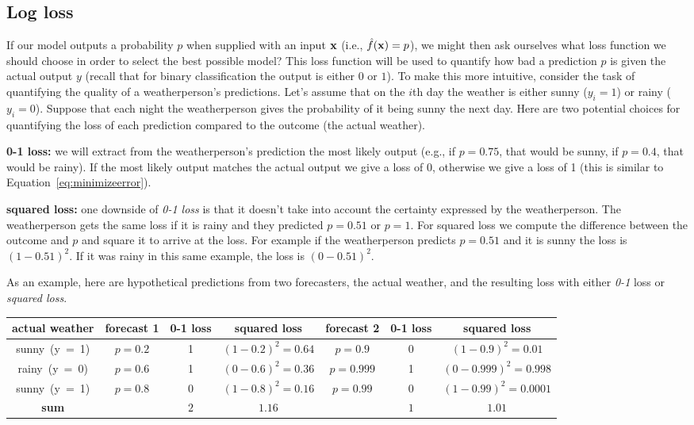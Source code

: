 \documentclass[assignment04_Solutions]{subfiles}
\begin{document}
\subsection{Log loss}
If our model outputs a probability $p$ when supplied with an input $\mathbf{x}$ (i.e., $\hat{f}(\mathbf{x}) = p$), we might then ask ourselves what loss function we should choose in order to select the best possible model?  This loss function will be used to quantify how bad a prediction $p$ is given the actual output $y$ (recall that for binary classification the output is either $0$ or $1$).  To make this more intuitive, consider the task of quantifying the quality of a weatherperson's predictions.  Let's assume that on the $i$th day the weather is either sunny ($y_i = 1$) or rainy ($y_i = 0$).  Suppose that each night the weatherperson gives the probability of it being sunny the next day.  Here are two potential choices for quantifying the loss of each prediction compared to the outcome (the actual weather).
\be
\item \textbf{0-1 loss:} we will extract from the weatherperson's prediction the most likely output (e.g., if $p = 0.75$, that would be sunny, if $p = 0.4$, that would be rainy).  If the most likely output matches the actual output we give a loss of 0, otherwise we give a loss of 1 (this is similar to Equation~\ref{eq:minimizeerror}).
\item \textbf{squared loss:} one downside of \emph{0-1 loss} is that it doesn't take into account the certainty expressed by the weatherperson.  The weatherperson gets the same loss if it is rainy and they predicted $p = 0.51$ or $p = 1$.  For squared loss we compute the difference between the outcome and $p$ and square it to arrive at the loss.  For example if the weatherperson predicts $p = 0.51$ and it is sunny the loss is $(1 - 0.51)^2$.  If it was rainy in this same example, the loss is $(0 - 0.51)^2$.
\ee

As an example, here are hypothetical predictions from two forecasters, the actual weather, and the resulting loss with either \emph{0-1} loss or \emph{squared loss}.


\begin{table}
\centering
\begin{tabular}{c | c | c | c | c | c | c}
\hline
actual weather & forecast 1 & 0-1 loss & squared loss & forecast 2 & 0-1 loss & squared loss \\
\hline
\mbox{sunny (y = 1)} & $p = 0.2$ & 1 & $(1-0.2)^2 = 0.64$ & $p = 0.9$ & 0 & $(1 - 0.9)^2 = 0.01$\\
\mbox{rainy (y = 0)} & $p = 0.6$  & 1 & $(0-0.6)^2 = 0.36$ & $p = 0.999$ & 1 & $(0 - 0.999)^2 = 0.998$ \\ 
\mbox{sunny (y = 1)} & $p = 0.8$ & 0 & $(1-0.8)^2 = 0.16$ & $p = 0.99$ & 0 & $(1 - 0.99)^2 = 0.0001$\\
\hline
\textbf{sum} & & $2$ & $1.16$ & & $1$ & $1.01$
\end{tabular}
\end{table}
\end{document}
